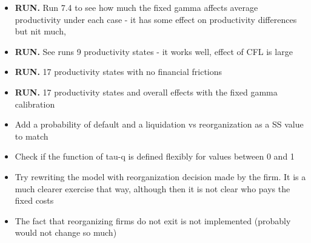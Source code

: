 \documentclass[12pt]{article}
\begin{document}
\begin{itemize}
    \item \textbf{RUN.} Run 7.4 to see how much the fixed gamma affects average productivity under each case - it has some effect on productivity differences but nit much, \checkmark
    \item \textbf{RUN.} See runs 9 productivity states - it works well, effect of CFL is large \checkmark
    \item \textbf{RUN.} 17 productivity states with no financial frictions \checkmark
    \item \textbf{RUN.} 17 productivity states and overall effects with the fixed gamma calibration \checkmark
    \item Add a probability of default and a liquidation vs reorganization as a SS value to match
    \item Check if the function of tau-q is defined flexibly for values between 0 and 1 \checkmark
    \item Try rewriting the model with reorganization decision made by the firm. It is a much clearer exercise that way, although then it is not clear who pays the fixed costs
    \item The fact that reorganizing firms do not exit is not implemented (probably would not change so much)
\end{itemize} \normalsize
\newpage
\end{document}
